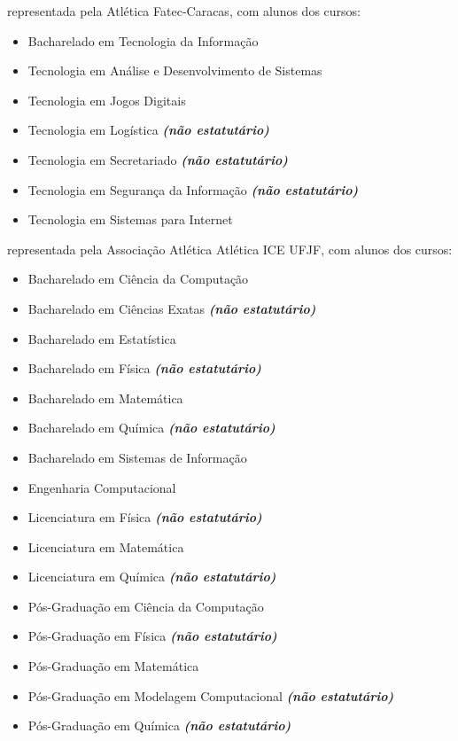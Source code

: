 \begin{article}
\begin{description}[noitemsep]
		\item[Faculdade de Tecnologia - Carapicuíba] representada pela Atlética Fatec-Caracas, com alunos dos cursos:
		\begin{itemize}[noitemsep]
			\item Bacharelado em Tecnologia da Informação
			\item Tecnologia em Análise e Desenvolvimento de Sistemas
			\item Tecnologia em Jogos Digitais
			\item Tecnologia em Logística \textbf{\textit{(não estatutário)}}
			\item Tecnologia em Secretariado \textbf{\textit{(não estatutário)}}
			\item Tecnologia em Segurança da Informação \textbf{\textit{(não estatutário)}}
			\item Tecnologia em Sistemas para Internet
		\end{itemize}

		\item[UFJF] representada pela Associação Atlética Atlética ICE UFJF, com alunos dos cursos:
		\begin{itemize}[noitemsep]
			\item Bacharelado em Ciência da Computação
			\item Bacharelado em Ciências Exatas \textbf{\textit{(não estatutário)}}
			\item Bacharelado em Estatística
			\item Bacharelado em Física \textbf{\textit{(não estatutário)}}
			\item Bacharelado em Matemática
			\item Bacharelado em Química \textbf{\textit{(não estatutário)}}
			\item Bacharelado em Sistemas de Informação
			\item Engenharia Computacional
			\item Licenciatura em Física \textbf{\textit{(não estatutário)}}
			\item Licenciatura em Matemática
			\item Licenciatura em Química \textbf{\textit{(não estatutário)}}
			\item Pós-Graduação em Ciência da Computação
			\item Pós-Graduação em Física \textbf{\textit{(não estatutário)}}
			\item Pós-Graduação em Matemática
			\item Pós-Graduação em Modelagem Computacional \textbf{\textit{(não estatutário)}}
			\item Pós-Graduação em Química \textbf{\textit{(não estatutário)}}
		\end{itemize}


\end{description}
\end{article}
